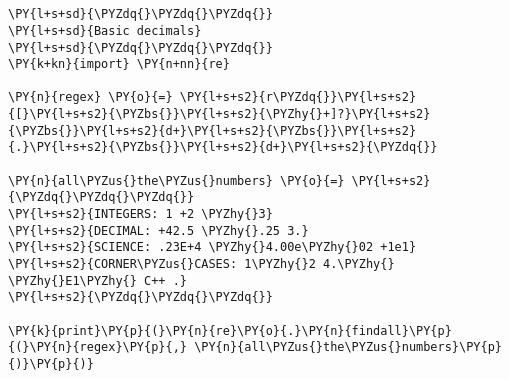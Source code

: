 

\section*{}

\begin{Verbatim}[commandchars=\\\{\}]
\PY{l+s+sd}{\PYZdq{}\PYZdq{}\PYZdq{}}
\PY{l+s+sd}{Basic decimals}
\PY{l+s+sd}{\PYZdq{}\PYZdq{}\PYZdq{}}
\PY{k+kn}{import} \PY{n+nn}{re}

\PY{n}{regex} \PY{o}{=} \PY{l+s+s2}{r\PYZdq{}}\PY{l+s+s2}{[}\PY{l+s+s2}{\PYZbs{}}\PY{l+s+s2}{\PYZhy{}+]?}\PY{l+s+s2}{\PYZbs{}}\PY{l+s+s2}{d+}\PY{l+s+s2}{\PYZbs{}}\PY{l+s+s2}{.}\PY{l+s+s2}{\PYZbs{}}\PY{l+s+s2}{d+}\PY{l+s+s2}{\PYZdq{}}

\PY{n}{all\PYZus{}the\PYZus{}numbers} \PY{o}{=} \PY{l+s+s2}{\PYZdq{}\PYZdq{}\PYZdq{}}
\PY{l+s+s2}{INTEGERS: 1 +2 \PYZhy{}3}
\PY{l+s+s2}{DECIMAL: +42.5 \PYZhy{}.25 3.}
\PY{l+s+s2}{SCIENCE: .23E+4 \PYZhy{}4.00e\PYZhy{}02 +1e1}
\PY{l+s+s2}{CORNER\PYZus{}CASES: 1\PYZhy{}2 4.\PYZhy{} \PYZhy{}E1\PYZhy{} C++ .}
\PY{l+s+s2}{\PYZdq{}\PYZdq{}\PYZdq{}}

\PY{k}{print}\PY{p}{(}\PY{n}{re}\PY{o}{.}\PY{n}{findall}\PY{p}{(}\PY{n}{regex}\PY{p}{,} \PY{n}{all\PYZus{}the\PYZus{}numbers}\PY{p}{)}\PY{p}{)}
\end{Verbatim}

